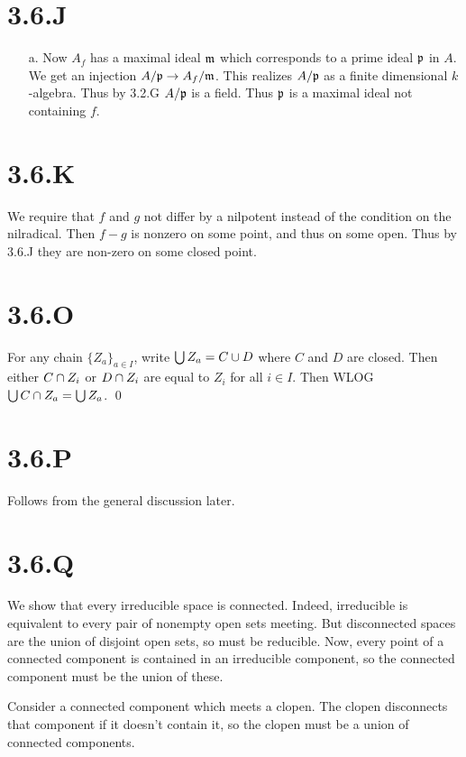\documentclass{article}
\begin{document}
\section{3.6.J}
\begin{itemize}
    \item [a.] Now $A_f$ has a maximal ideal $\mathfrak{m}$ which
          corresponds to a prime ideal $\mathfrak{p}$ in $A$.
          We get an injection $A/\mathfrak{p} \to A_f/\mathfrak{m}$. This realizes
          $A/\mathfrak{p}$ as a finite dimensional $k$-algebra.
          Thus by 3.2.G $A/\mathfrak{p}$ is a field. Thus $\mathfrak{p}$ is
          a maximal ideal not containing $f$.
\end{itemize}

\section{3.6.K}
We require that $f$ and $g$ not differ
by a nilpotent instead of the condition on the nilradical. Then
$f-g$ is nonzero on some point, and thus on some open. Thus
by 3.6.J they are non-zero on some closed point.

\section{3.6.O}
For any chain $\{Z_a\}_{a \in I}$, write $\bigcup Z_a=C \cup D$ where
$C$ and $D$ are closed. Then either
$C \cap Z_i$ or $D \cap Z_i$ are equal to
$Z_i$ for all $i \in I$. Then WLOG
$\bigcup C \cap Z_a=\bigcup Z_a$. \qed

\section{3.6.P}
Follows from the general discussion later.

\section{3.6.Q}
We show that every irreducible space is connected. Indeed, irreducible is
equivalent to every pair of nonempty open sets meeting. But disconnected spaces
are the union of disjoint open sets, so must be reducible. Now, every point of
a connected component is contained in an irreducible component, so the
connected component must be the union of these.

Consider a connected component which meets a clopen. The clopen disconnects
that component if it doesn't contain it, so the clopen must be a union of
connected components.
\end{document}
